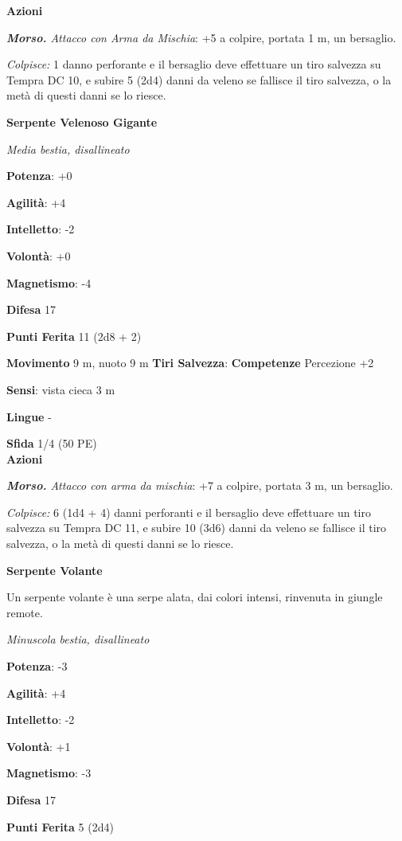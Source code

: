 \begin{multicols}{2}
\smallskip\textbf{Azioni}

\emph{\textbf{Morso.} Attacco con Arma da Mischia}: +5 a colpire,
portata 1 m, un bersaglio.

\emph{Colpisce:} 1 danno perforante e il bersaglio deve effettuare un
tiro salvezza su Tempra DC 10, e subire 5 (2d4) danni da veleno se
fallisce il tiro salvezza, o la metà di questi danni se lo riesce.

\textbf{Serpente Velenoso Gigante}

\emph{Media bestia, disallineato}

\textbf{Potenza}: +0

\textbf{Agilità}: +4

\textbf{Intelletto}: -2

\textbf{Volontà}: +0

\textbf{Magnetismo}: -4

\textbf{Difesa} 17

\textbf{Punti Ferita} 11 (2d8 + 2)

\textbf{Movimento} 9 m, nuoto 9 m
\textbf{Tiri Salvezza}:
\textbf{Competenze} Percezione +2

\textbf{Sensi}: vista cieca 3 m

\textbf{Lingue} -

\textbf{Sfida} 1/4 (50 PE)\smallskip\\

\smallskip\textbf{Azioni}

\emph{\textbf{Morso.} Attacco con arma da mischia}: +7 a colpire,
portata 3 m, un bersaglio.

\emph{Colpisce:} 6 (1d4 + 4) danni perforanti e il bersaglio deve
effettuare un tiro salvezza su Tempra DC 11, e subire 10 (3d6)
danni da veleno se fallisce il tiro salvezza, o la metà di questi danni
se lo riesce.

\textbf{Serpente Volante}

Un serpente volante è una serpe alata, dai colori intensi, rinvenuta in
giungle remote.

\emph{Minuscola bestia, disallineato}

\textbf{Potenza}: -3

\textbf{Agilità}: +4

\textbf{Intelletto}: -2

\textbf{Volontà}: +1

\textbf{Magnetismo}: -3

\textbf{Difesa} 17

\textbf{Punti Ferita} 5 (2d4)


\end{multicols}
